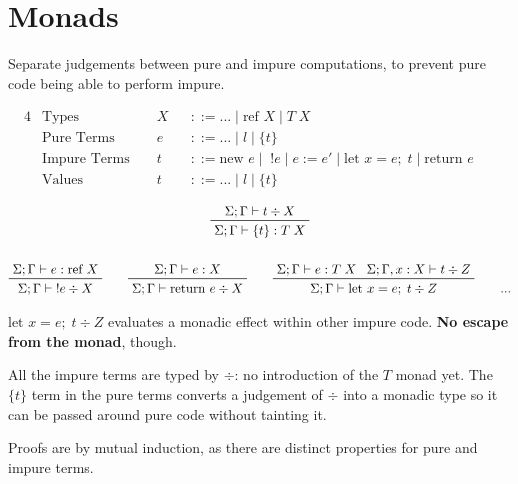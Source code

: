 \documentclass[a4paper,11pt]{article}
\begin{document}
\section{Monads}
{
    Separate judgements between pure and impure computations, to prevent pure code being able to perform impure.

    \begin{alignat*}{4}
    &\text{Types } &&X &&::= ... \mid \text{ref }X \mid T\;X && \\
    &\text{Pure Terms } &&e &&::= ... \mid l \mid \{t\} && \\
    &\text{Impure Terms } &&t &&::= \text{new }e \mid \;!e \mid e:=e' \mid \text{let }x=e;\;t \mid \text{return }e && \\
    &\text{Values } &&t &&::= ... \mid l \mid \{t\} &&
    \end{alignat*}

    \begin{gather*}
    \prftree[r]{}
    {\Sigma;\Gamma\vdash t \div X}
    {\Sigma;\Gamma\vdash \{t\} : T\;X}
    \\
    \\
    \prftree[r]{}
    {\Sigma;\Gamma\vdash e : \text{ref }X}
    {\Sigma;\Gamma\vdash \;!e \div X}
    \qquad
    \prftree[r]{}
    {\Sigma;\Gamma\vdash e : X}
    {\Sigma;\Gamma\vdash \text{return }e \div X}
    \qquad
    \prftree[r]{}
    {\Sigma;\Gamma\vdash e : T\;X}
    {\Sigma;\Gamma,x:X \vdash t \div Z}
    {\Sigma;\Gamma\vdash\text{let }x=e;\;t\div Z}
    \qquad
    ...
    \end{gather*}

    \(\text{let }x=e;\;t\div Z\) evaluates a monadic effect within other impure code. \textbf{No escape from the monad},
    though.

    All the impure terms are typed by \(\div\): no introduction of the \(T\) monad yet. The \(\{t\}\) term in the pure
    terms converts a judgement of \(\div\) into a monadic type so it can be passed around pure code without tainting it.

    Proofs are by mutual induction, as there are distinct properties for pure and impure terms.
}
\end{document}
